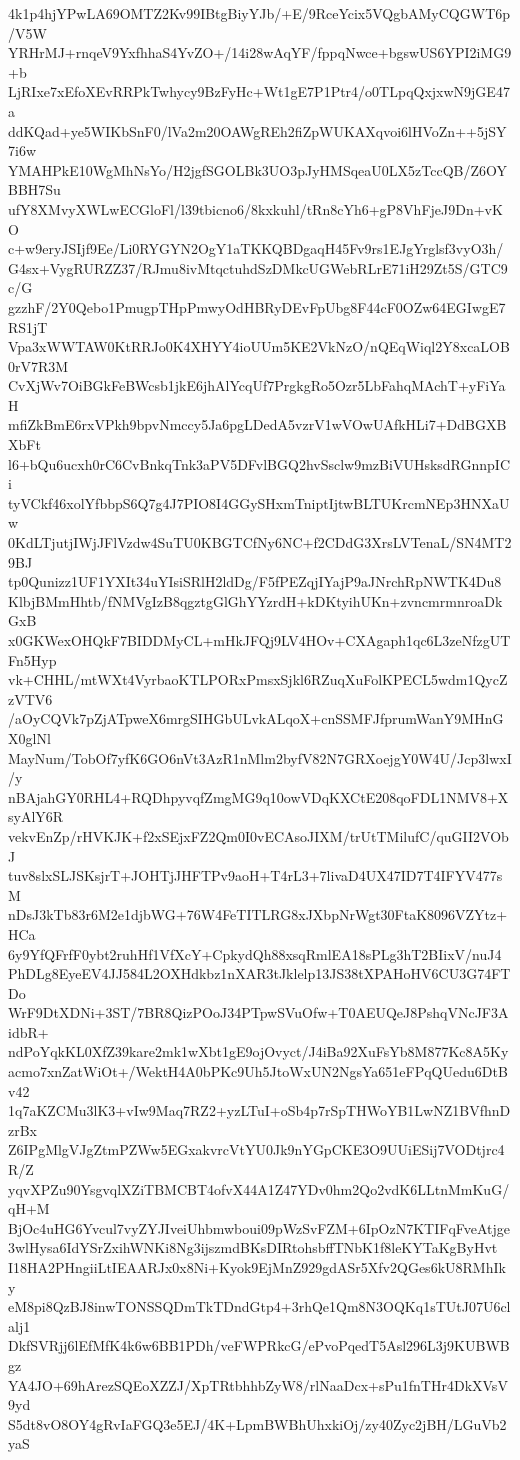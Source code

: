 4k1p4hjYPwLA69OMTZ2Kv99IBtgBiyYJb/+E/9RceYcix5VQgbAMyCQGWT6p/V5W
YRHrMJ+rnqeV9YxfhhaS4YvZO+/14i28wAqYF/fppqNwce+bgswUS6YPI2iMG9+b
LjRIxe7xEfoXEvRRPkTwhycy9BzFyHc+Wt1gE7P1Ptr4/o0TLpqQxjxwN9jGE47a
ddKQad+ye5WIKbSnF0/lVa2m20OAWgREh2fiZpWUKAXqvoi6lHVoZn++5jSY7i6w
YMAHPkE10WgMhNsYo/H2jgfSGOLBk3UO3pJyHMSqeaU0LX5zTccQB/Z6OYBBH7Su
ufY8XMvyXWLwECGloFl/l39tbicno6/8kxkuhl/tRn8cYh6+gP8VhFjeJ9Dn+vKO
c+w9eryJSIjf9Ee/Li0RYGYN2OgY1aTKKQBDgaqH45Fv9rs1EJgYrglsf3vyO3h/
G4sx+VygRURZZ37/RJmu8ivMtqctuhdSzDMkcUGWebRLrE71iH29Zt5S/GTC9c/G
gzzhF/2Y0Qebo1PmugpTHpPmwyOdHBRyDEvFpUbg8F44cF0OZw64EGIwgE7RS1jT
Vpa3xWWTAW0KtRRJo0K4XHYY4ioUUm5KE2VkNzO/nQEqWiql2Y8xcaLOB0rV7R3M
CvXjWv7OiBGkFeBWcsb1jkE6jhAlYcqUf7PrgkgRo5Ozr5LbFahqMAchT+yFiYaH
mfiZkBmE6rxVPkh9bpvNmccy5Ja6pgLDedA5vzrV1wVOwUAfkHLi7+DdBGXBXbFt
l6+bQu6ucxh0rC6CvBnkqTnk3aPV5DFvlBGQ2hvSsclw9mzBiVUHsksdRGnnpICi
tyVCkf46xolYfbbpS6Q7g4J7PIO8I4GGySHxmTniptIjtwBLTUKrcmNEp3HNXaUw
0KdLTjutjIWjJFlVzdw4SuTU0KBGTCfNy6NC+f2CDdG3XrsLVTenaL/SN4MT29BJ
tp0Qunizz1UF1YXIt34uYIsiSRlH2ldDg/F5fPEZqjIYajP9aJNrchRpNWTK4Du8
KlbjBMmHhtb/fNMVgIzB8qgztgGlGhYYzrdH+kDKtyihUKn+zvncmrmnroaDkGxB
x0GKWexOHQkF7BIDDMyCL+mHkJFQj9LV4HOv+CXAgaph1qc6L3zeNfzgUTFn5Hyp
vk+CHHL/mtWXt4VyrbaoKTLPORxPmsxSjkl6RZuqXuFolKPECL5wdm1QycZzVTV6
/aOyCQVk7pZjATpweX6mrgSIHGbULvkALqoX+cnSSMFJfprumWanY9MHnGX0glNl
MayNum/TobOf7yfK6GO6nVt3AzR1nMlm2byfV82N7GRXoejgY0W4U/Jcp3lwxI/y
nBAjahGY0RHL4+RQDhpyvqfZmgMG9q10owVDqKXCtE208qoFDL1NMV8+XsyAlY6R
vekvEnZp/rHVKJK+f2xSEjxFZ2Qm0I0vECAsoJIXM/trUtTMilufC/quGII2VObJ
tuv8slxSLJSKsjrT+JOHTjJHFTPv9aoH+T4rL3+7livaD4UX47ID7T4IFYV477sM
nDsJ3kTb83r6M2e1djbWG+76W4FeTITLRG8xJXbpNrWgt30FtaK8096VZYtz+HCa
6y9YfQFrfF0ybt2ruhHf1VfXcY+CpkydQh88xsqRmlEA18sPLg3hT2BIixV/nuJ4
PhDLg8EyeEV4JJ584L2OXHdkbz1nXAR3tJklelp13JS38tXPAHoHV6CU3G74FTDo
WrF9DtXDNi+3ST/7BR8QizPOoJ34PTpwSVuOfw+T0AEUQeJ8PshqVNcJF3AidbR+
ndPoYqkKL0XfZ39kare2mk1wXbt1gE9ojOvyct/J4iBa92XuFsYb8M877Kc8A5Ky
acmo7xnZatWiOt+/WektH4A0bPKc9Uh5JtoWxUN2NgsYa651eFPqQUedu6DtBv42
1q7aKZCMu3lK3+vIw9Maq7RZ2+yzLTuI+oSb4p7rSpTHWoYB1LwNZ1BVfhnDzrBx
Z6IPgMlgVJgZtmPZWw5EGxakvrcVtYU0Jk9nYGpCKE3O9UUiESij7VODtjrc4R/Z
yqvXPZu90YsgvqlXZiTBMCBT4ofvX44A1Z47YDv0hm2Qo2vdK6LLtnMmKuG/qH+M
BjOc4uHG6Yvcul7vyZYJIveiUhbmwboui09pWzSvFZM+6IpOzN7KTIFqFveAtjge
3wlHysa6IdYSrZxihWNKi8Ng3ijszmdBKsDIRtohsbffTNbK1f8leKYTaKgByHvt
I18HA2PHngiiLtIEAARJx0x8Ni+Kyok9EjMnZ929gdASr5Xfv2QGes6kU8RMhIky
eM8pi8QzBJ8inwTONSSQDmTkTDndGtp4+3rhQe1Qm8N3OQKq1sTUtJ07U6clalj1
DkfSVRjj6lEfMfK4k6w6BB1PDh/veFWPRkcG/ePvoPqedT5Asl296L3j9KUBWBgz
YA4JO+69hArezSQEoXZZJ/XpTRtbhhbZyW8/rlNaaDcx+sPu1fnTHr4DkXVsV9yd
S5dt8vO8OY4gRvIaFGQ3e5EJ/4K+LpmBWBhUhxkiOj/zy40Zyc2jBH/LGuVb2yaS
